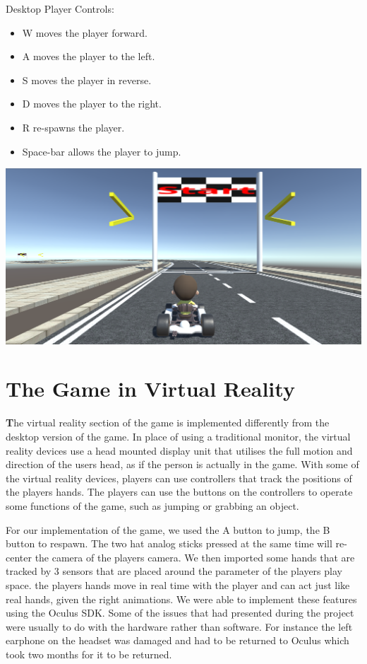 Desktop Player Controls:
\begin{itemize}
\item W moves the player forward.
\item A moves the player to the left.
\item S moves the player in reverse.
\item D moves the player to the right.
\item R re-spawns the player.
\item Space-bar allows the player to jump. 
\end{itemize}
\includegraphics[width=1\columnwidth]{img/GameActual.PNG}

\section{The Game in Virtual Reality}

\textbf
The virtual reality section of the game is implemented differently from the desktop version of the game. In place of using a traditional monitor, the virtual reality devices use a head mounted display unit that utilises the full motion and direction of the users head, as if the person is actually in the game. With some of the virtual reality devices, players can use controllers that track the positions of the players hands. The players can use the buttons on the controllers to operate some functions of the game, such as jumping or grabbing an object.\newline

For our implementation of the game, we used the A button to jump, the B button to respawn. The two hat analog sticks pressed at the same time will re-center the camera of the players camera. We then imported some hands that are tracked by 3 sensors that are placed around the parameter of the players play space. the players hands move in real time with the player and can act just like real hands, given the right animations.\newline 
We were able to implement these features using the Oculus SDK. Some of the issues that had presented during the project were usually to do with the hardware rather than software. For instance the left earphone on the headset was damaged and had to be returned to Oculus which took two months for it to be returned.\newline


